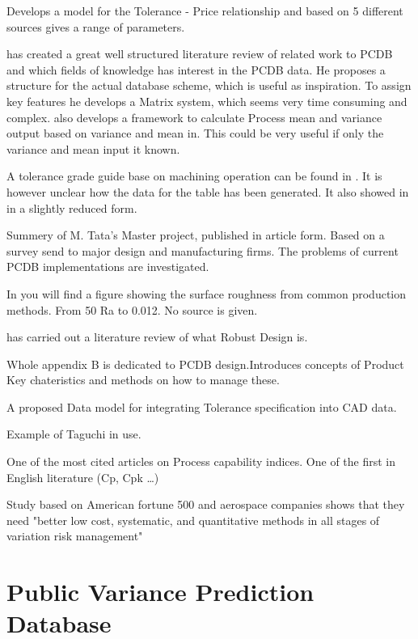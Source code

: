 \documentclass[aip,amsmath,reprint, author-year]{revtex4-1}
\begin{document}
\citet{sfantsikopoulos1990cost} Develops a model for the Tolerance - Price relationship and based on 5 different sources gives a range of parameters. 

\citet{kern2003forecasting} has created a great well structured literature review of related work to PCDB and which fields of knowledge has interest in the PCDB data. 
He proposes a structure for the actual database scheme, which is useful as inspiration. 
To assign key features he develops a Matrix system, which seems very time consuming and complex. 
\citet{kern2003forecasting} also develops a framework to calculate Process mean and variance output based on variance and mean in. 
This could be very useful if only the variance and mean input it known.

A tolerance grade guide base on machining operation can be found in \citet{american1978preferred}. It is however unclear how the data for the table has been generated. It also showed in \citet{united1967preferred} in a slightly reduced form.

\citet{tata1999process} Summery of M. Tata's Master project, published in article form. Based on a survey send to major design and manufacturing firms. The problems of current PCDB implementations are investigated. 

In \citet[p. 715]{oberg2008machinery} you will find a figure showing the surface roughness from common production methods. From 50 Ra to 0.012. No source is given.

\citet{arvidsson2008principles} has carried out a literature review of what Robust Design is.


\citet{thornton2004variation} Whole appendix B is dedicated to PCDB design.Introduces concepts of Product Key chateristics and methods on how to manage these.

\citet{feng1995dimension} A proposed Data model for integrating Tolerance specification into CAD data. 

\citet{yang1998design} Example of Taguchi in use. 

\citet{kane1986process} One of the most cited articles on Process capability indices. One of the first in English literature (Cp, Cpk …)

\citet{thornton2000more}Study based on American fortune 500 and aerospace companies shows that they need "better low cost, systematic, and quantitative methods in all stages of variation risk management"

\section{Public Variance Prediction Database}
\end{document}
